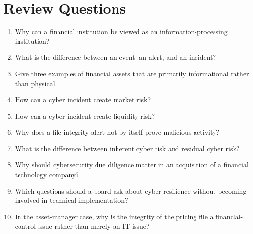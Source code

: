 \section{Review Questions}

\begin{enumerate}
    \item Why can a financial institution be viewed as an information-processing institution?
    \item What is the difference between an event, an alert, and an incident?
    \item Give three examples of financial assets that are primarily informational rather than physical.
    \item How can a cyber incident create market risk?
    \item How can a cyber incident create liquidity risk?
    \item Why does a file-integrity alert not by itself prove malicious activity?
    \item What is the difference between inherent cyber risk and residual cyber risk?
    \item Why should cybersecurity due diligence matter in an acquisition of a financial technology company?
    \item Which questions should a board ask about cyber resilience without becoming involved in technical implementation?
    \item In the asset-manager case, why is the integrity of the pricing file a financial-control issue rather than merely an IT issue?
\end{enumerate}
